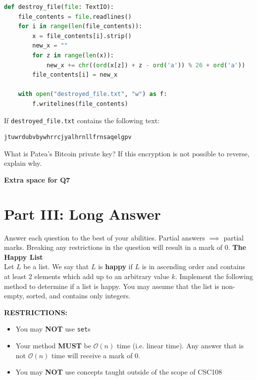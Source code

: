 \documentclass[letterpaper,12pt,addpoints]{exam}
\begin{document}
\begin{questions}
\begin{lstlisting}[language=Python, style=mystyle]
def destroy_file(file: TextIO):
    file_contents = file.readlines()
    for i in range(len(file_contents)):
        x = file_contents[i].strip()
        new_x = ""
        for z in range(len(x)):
            new_x += chr((ord(x[z]) + z - ord('a')) % 26 + ord('a'))
        file_contents[i] = new_x

    with open("destroyed_file.txt", "w") as f:
        f.writelines(file_contents)
    \end{lstlisting}

    If \texttt{destroyed\_file.txt} contains the following text:
    \begin{lstlisting}[language=Python, style=mystyle]
jtuwrdubvbywhrrcjyalhrnllfrnsaqelgpv
    \end{lstlisting}
    What is Patea's Bitcoin private key? If this encryption is not possible to reverse, explain why.

    \clearpage

    \begin{center}
        \textbf{Extra space for Q7}\\        
    \end{center}
    \clearpage

    \section*{Part III: Long Answer} 
    \setcounter{question}{0}
    Answer each question to the best of your abilities. Partial answers $\implies$ partial marks. Breaking any restrictions in the question will result in a mark of 0.
    \question[10] \textbf{The Happy List} \\
    Let $L$ be a list. We say that $L$ is \textbf{happy} if $L$ is in ascending order and contains at least 2 elements which add up to an arbitrary value $k$. Implement the following method to determine if a list is happy. You may assume that the list is non-empty, sorted, and contains only integers.

    \begin{center}
        
        \textbf{RESTRICTIONS:}
        \begin{itemize}
            \item You may \textbf{NOT} use \texttt{set}s
            \item Your method \textbf{MUST} be $\mathcal{O}(n)$ time (i.e. linear time). Any answer that is not $\mathcal{O}(n)$ time will receive a mark of 0.
            \item You may \textbf{NOT} use concepts taught outside of the scope of CSC108
        \end{itemize}
    \end{center}


\end{questions}
\end{document}
